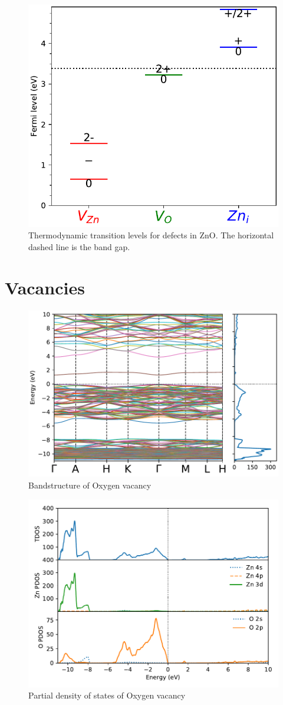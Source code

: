 \begin{figure}[tbh!]
	\centering
	\includegraphics[width=0.4\linewidth]{"images/rnd/trans_lvl"}
	\caption[Thermodynamic transition levels for defects in ZnO]{Thermodynamic transition levels for defects in ZnO. The horizontal dashed line is the band gap.}
\end{figure}




\section{Vacancies}

\begin{figure}[tbh!]
	\centering
	\includegraphics[width=0.7\linewidth]{"images/rnd/band-dos_O_vac"}
	\caption[Bandstructure of Oxygen vacancy]{Bandstructure of Oxygen vacancy}
\end{figure}

\begin{figure}[tbh!]
	\centering
	\includegraphics[width=0.7\linewidth]{"images/rnd/dos-pdos_O_vac"}
	\caption[Partial density of states of Oxygen vacancy]{Partial density of states of Oxygen vacancy}
\end{figure}


